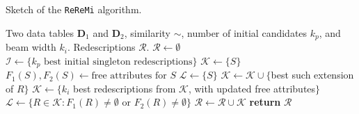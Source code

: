 \documentclass{article}
\newcommand{\algname}[1]{\texttt{#1}}
\newcommand{\Table}{\mathbf{D}}
\newcommand{\similar}{\sim}
\newcommand{\iLHS}{1}
\newcommand{\iRHS}{2}
\newcommand{\reremi}{\algname{ReReMi}\xspace}
\begin{document}
\begin{algorithm}[tb]
\caption{Sketch of the \reremi algorithm.}
  \label{alg:reremi}
\begin{algorithmic}[1]
\small
  \Require Two data tables $\Table_1$ and $\Table_2$, similarity $\similar$, number of initial candidates $k_p$, and beam width $k_i$.
  \Ensure Redescriptions $\mathcal{R}$.
\State $\mathcal{R} \gets \emptyset$
\State $\mathcal{I} \gets \{ k_p \text{ best initial singleton redescriptions}\}$ \label{alg:reremi:pairs}
 \label{alg:reremi:ext-start}
    \State $\mathcal{K} \gets \{ S \}$  
    \State $F_1(S), F_2(S) \gets \text{free attributes for } S$  \label{alg:reremi:initfs}
        \State $\mathcal{L} \gets \{ S \}$  \label{alg:reremi:ext-start2}
    \EndIf
      \label{alg:reremi:while-start} 
            \label{alg:reremi:eachso-start}
                  \State $\mathcal{K} \gets \mathcal{K} \cup  \{$best
                    such extension of $R\}$ \label{alg:reremi:ext}
               \EndIf
           \EndFor \label{alg:reremi:eachso-end}
        \EndFor
        \State $\mathcal{K} \gets \{ k_i$  best redescriptions from $\mathcal{K}$, with updated free attributes$\}$ \label{alg:reremi:kcand} 
        \State $\mathcal{L} \gets \{ R \in \mathcal{K}: F_1(R) \neq \emptyset \text{ or } F_2(R) \neq \emptyset \}$ \label{alg:reremi:extc}
        \EndWhile
    \State $\mathcal{R} \gets \mathcal{R} \cup \mathcal{K}$\label{alg:reremi:ext-end}
\EndFor 
\State \textbf{return} $\mathcal{R}$
\end{algorithmic}
\end{algorithm}
\end{document}
